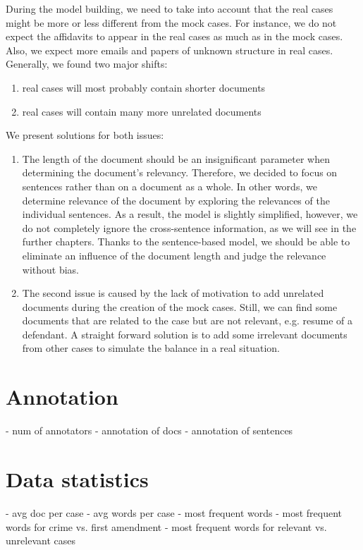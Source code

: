 \documentclass[
  digital, %
  table,   %
  lof,     %
  lot,     %
]{fithesis3}
\begin{document}
During the model building, we need to take into account that the real cases might be more or less different from the mock cases.
For instance, we do not expect the affidavits to appear in the real cases as much as in the mock cases.
Also, we expect more emails and papers of unknown structure in real cases.
Generally, we found two major shifts: 
\begin{enumerate}
\item real cases will most probably contain shorter documents
\item real cases will contain many more unrelated documents
\end{enumerate}
We present solutions for both issues:
\begin{enumerate}
\item 
The length of the document should be an insignificant parameter when determining the document's relevancy.
Therefore, we decided to focus on sentences rather than on a document as a whole.
In other words, we determine relevance of the document by exploring the relevances of the individual sentences.
As a result, the model is slightly simplified, however, we do not completely ignore the cross-sentence information, as we will see in the further chapters.
Thanks to the sentence-based model, we should be able to eliminate an influence of the document length and judge the relevance without bias.

\item
The second issue is caused by the lack of motivation to add unrelated documents during the creation of the mock cases.
Still, we can find some documents that are related to the case but are not relevant, e.g. resume of a defendant.
A straight forward solution is to add some irrelevant documents from other cases to simulate the balance in a real situation.

\end{enumerate}

\section{Annotation}
- num of annotators
- annotation of docs
- annotation of sentences

\section{Data statistics}
- avg doc per case
- avg words per case
- most frequent words
- most frequent words for crime vs. first amendment
- most frequent words for relevant vs. unrelevant cases
\end{document}
